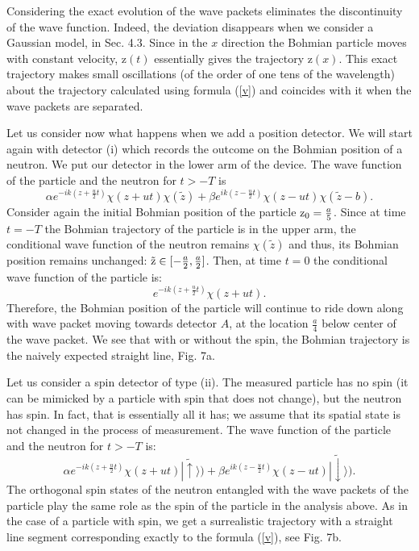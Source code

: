 \documentclass[preprint,tightenlines]{elsarticle}
\begin{document}
 Considering the exact evolution of the wave packets
eliminates the discontinuity of the wave function. Indeed, the deviation disappears
when we consider a Gaussian model, in Sec. 4.3.
 Since in the $x$ direction the Bohmian particle moves with constant
velocity, $\mathrm{z}(t)$ essentially gives the trajectory $\mathrm{z}(x)$.
This exact trajectory makes small oscillations (of the order of one tens of the wavelength) about the trajectory
calculated using formula (\ref{v}) and coincides with it when the
wave packets are separated.

Let us consider now what happens when we add a position detector.
We will start again with detector (i) which records the outcome on
the Bohmian position of a neutron.
We put our detector in the lower arm of the device. The wave
function of the particle and the neutron for $t>-T$ is
 \begin{equation}
\alpha e^{-ik(z+\frac{u}{2}t)}\chi(z+ut)\chi(\tilde{z})+\beta e^{ik(z-\frac{u}{2}t)}\chi(z-ut)\chi(\tilde{z}-b).\label{psioutnospin2}
\end{equation}
 Consider again the initial Bohmian position of the particle ${\rm z_{0}}=\frac{a}{5}$.
Since at time $t=-T$ the Bohmian trajectory of the particle  is in the upper arm, the conditional wave function of the neutron
remains $\chi(\tilde{z})$ and thus, its Bohmian position remains
unchanged: ${\rm \tilde{z}}\in[-\frac{a}{2},\frac{a}{2}]$. Then,
at time $t=0$ the conditional wave function of the particle is:
 \begin{equation}
e^{-ik(z+\frac{u}{2}t)}\chi(z+ut).\label{psiout5}
\end{equation}
 Therefore, the Bohmian position of the particle will continue to
ride down along with wave packet moving towards detector $A$, at the location $\frac{a}{4}$
below center of the wave packet. We see that with or without
the spin, the Bohmian trajectory is the naively expected straight line, Fig. 7a.

Let us consider a spin detector of type (ii). The measured particle
has no spin (it can be mimicked by a particle with spin that does not
change), but the neutron has spin. In fact, that is essentially all it has; we
assume that its spatial state is not changed in the process of measurement.
The wave function of the particle and the neutron for $t>-T$ is:
\begin{equation}
\alpha e^{-ik(z+\frac{u}{2}t)}\chi(z+ut)|\tilde{\uparrow}\rangle)+\beta e^{ik(z-\frac{u}{2}t)}\chi(z-ut)|\tilde{\downarrow}\rangle).\label{psioutnox33ns}\end{equation}
 The orthogonal spin states of the neutron entangled with the wave
packets of the particle play the same role as the spin of the particle
in the analysis above. As in the case of a particle with  spin, we get a surrealistic trajectory with a straight
line segment corresponding exactly to the formula (\ref{v}), see Fig. 7b.
\end{document}
